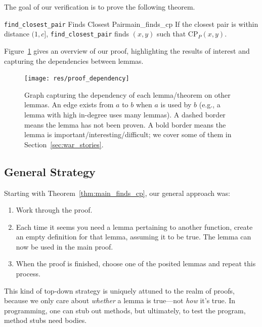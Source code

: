 \documentclass{article}
\begin{document}
The goal of our verification is to prove the following theorem.
\begin{tcbtheorem}{{\large\texttt{find\_closest\_pair}} Finds Closest Pair}{main_finds_cp}
If the closest pair is within distance $(1, c]$, \texttt{find\_closest\_pair} finds $(x, y)$ such that $\text{CP}_P(x, y)$.
\end{tcbtheorem}
Figure~\ref{fig:proof_dependency} gives an overview of our proof, highlighting the results of interest and capturing the dependencies between lemmas.

\begin{figure}[H]
  \label{fig:proof_dependency}
  \begin{center}
  \texttt{[image: res/proof\_dependency]}
  \end{center}
  \caption{
    Graph capturing the dependency of each lemma/theorem on other lemmas.
    An edge exists from $a$ to $b$ when $a$ is used by $b$ (e.g., a lemma with high in-degree uses many lemmas).
    A dashed border means the lemma has not been proven.
    A bold border means the lemma is important/interesting/difficult; we cover some of them in Section~\ref{sec:war_stories}.
  }
\end{figure}

\subsection{General Strategy}
Starting with Theorem~\ref{thm:main_finds_cp}, our general approach was:
\begin{enumerate}
  \item Work through the proof.
  \item Each time it seems you need a lemma pertaining to another function, create an empty definition for that lemma, assuming it to be true.
  The lemma can now be used in the main proof.
  \item When the proof is finished, choose one of the posited lemmas and repeat this process.
\end{enumerate}
This kind of top-down strategy is uniquely attuned to the realm of proofs, because we only care about \textit{whether} a lemma is true---not \textit{how} it's true.
In programming, one can stub out methods, but ultimately, to test the program, method stubs need bodies.
\end{document}
